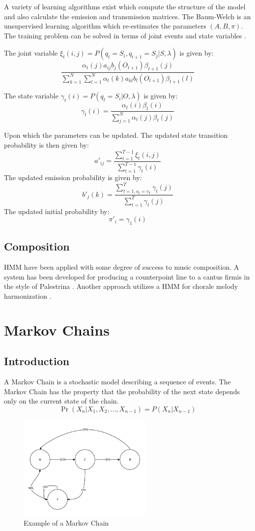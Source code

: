 A variety of learning algorithms exist which compute the structure of the model and also calculate the emission and transmission matrices. The Baum-Welch is an unsupervised learning algorithm which re-estimates the parameters $(A,B,\pi)$. The training problem can be solved in terms of joint events and state variables \cite{Baum1970}.

The joint variable $\xi_t(i,j) = P(q_t = S_i, q_{t+1} = S_j|S, \lambda)$ is given by:
\[ \frac{\alpha_t (j) a_{ij} b_j (O_{t+1}) \beta_{t+1}(j) }{\sum_{k=1}^N \sum_{l=1}^N \alpha_t (k) a_{kl} b_l (O_{t+1}) \beta_{t+1}(l) } \] 

The state variable $\gamma_t(i) = P(q_t = S_i | O, \lambda)$ is given by:
\[ 
\gamma_t(i) = \frac{\alpha_t (i) \beta_t(i)}{\sum_{j=1}^N \alpha_t (j) \beta_t (j)}
\]

Upon which the parameters can be updated. The updated state transition probability is then given by:
\[a'_{ij} = \frac{\sum^{T-1}_{t=1} \xi_t (i,j)}{\sum_{t=1}^{T-1} \gamma_t (i)} \]
The updated emission probability is given by:
\[ b'_j (k) = \frac{\sum^T_{t=1,o_t = v_k} \gamma_t (j)}{\sum^T_{t=1} \gamma_t (j)} \]
The updated initial probability by:
\[ \pi'_i = \gamma_1 (i) \]

\subsection{Composition}
\acs{HMM} have been applied with some degree of success to music composition. A system has been developed for producing a counterpoint line to a cantus firmis in the style of Palestrina \cite{Farbood2001}. Another approach utilizes a \ac{HMM} for chorale melody harmonization \cite{Allan2004}.



\section{Markov Chains} \label{sec:markov_backround}
\subsection{Introduction}
A Markov Chain is a stochastic model describing a sequence of events. The Markov Chain has the property that the probability of the next state depends only on the current state of the chain.
\[ \Pr(X_n | X_1, X_2, \ldots, X_{n-1}) = P(X_n | X_{n-1})  \]

\begin{figure}
\center
\includegraphics[width=250px]{../images/markov_chain_example.pdf}
\caption{Example of a Markov Chain}
\label{ims:markov_chain_example}
\end{figure}

